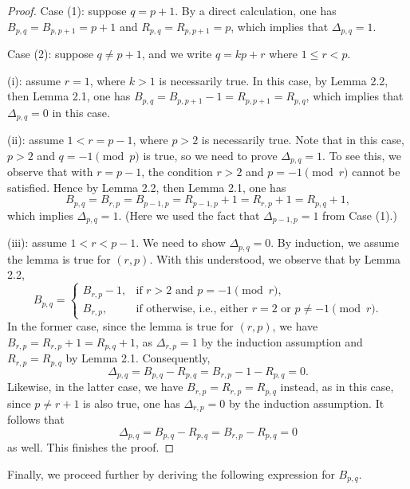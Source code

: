 \documentclass[11pt]{amsart}
\theoremstyle{plain}
\numberwithin{theorem}{section}
\theoremstyle{definition}
\begin{document}
\begin{proof}
Case (1): suppose $q=p+1$. By a direct calculation, one has $B_{p,q}=B_{p,p+1}=p+1$ and 
$R_{p,q}=R_{p,p+1}=p$, which implies that $\Delta_{p,q}=1$.

\vspace{2mm}

Case (2): suppose $q\neq p+1$, and we write $q=kp+r$ where $1\leq r<p$. 

\vspace{2mm}

(i): assume $r=1$, where $k>1$ is necessarily true. In this case, by Lemma 2.2, then Lemma  2.1, one has $B_{p,q}=B_{p, p+1}-1=R_{p,p+1}=R_{p,q}$, which implies that $\Delta_{p,q}=0$ in this case.

\vspace{2mm} 

(ii): assume $1<r=p-1$, where $p>2$ is necessarily true. Note that in this case, $p>2$ and $q=-1\pmod{p}$ is true, so we need to prove $\Delta_{p,q}=1$. To see this, we observe that with $r=p-1$, the condition $r>2$ and $p=-1\pmod{r}$ cannot be satisfied. Hence by Lemma 2.2, then
Lemma 2.1, one has 
$$
B_{p,q}=B_{r,p}=B_{p-1, p}=R_{p-1,p}+1=R_{r,p}+1=R_{p,q}+1,
$$ 
which implies $\Delta_{p,q}=1$. (Here we used the fact that $\Delta_{p-1,p}=1$ from Case (1).)

\vspace{2mm} 

(iii): assume $1<r<p-1$. We need to show $\Delta_{p,q}=0$. 
By induction, we assume the lemma is true for $(r,p)$. With this understood, 
we observe that by Lemma 2.2,
\[
  B_{p,q}=
  \begin{cases}
    B_{r,p}-1, & \text{if } r>2 \text{ and } p= -1\pmod r,\\
    B_{r,p}, & \text{if otherwise, i.e., either } r=2 \text{ or } p\neq -1\pmod r.
  \end{cases}
\]
In the former case, since the lemma is true for $(r,p)$, we have $B_{r,p}=R_{r,p}+1=R_{p,q}+1$,
as $\Delta_{r,p}=1$ by the induction assumption and $R_{r,p}=R_{p,q}$ by Lemma 2.1. Consequently, 
$$
\Delta_{p,q}=B_{p,q}-R_{p,q}=B_{r,p}-1-R_{p,q}=0.
$$
Likewise, in the latter case, we have $B_{r,p}=R_{r,p}=R_{p,q}$ instead, as in this case, since
$p\neq r+1$ is also true, one has $\Delta_{r,p}=0$ by the induction assumption. It follows that 
$$
\Delta_{p,q}=B_{p,q}-R_{p,q}=B_{r,p}-R_{p,q}=0
$$
as well. This finishes the proof. 
\end{proof}

Finally, we proceed further by deriving the following expression for $B_{p,q}$.
\end{document}
